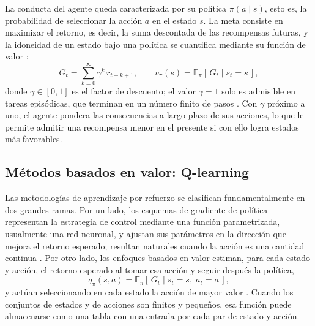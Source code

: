 La conducta del agente queda caracterizada por su política $\pi(a \mid s)$, esto es, la probabilidad de seleccionar la acción $a$ en el estado $s$.
La meta consiste en maximizar el retorno, es decir, la suma descontada de las recompensas futuras, y la idoneidad de un estado bajo una política se cuantifica mediante su función de valor \cite{sutton2018rl}:
\begin{equation}
G_t = \sum_{k=0}^{\infty} \gamma^{k}\, r_{t+k+1},
\qquad
v_{\pi}(s) = \mathbb{E}_{\pi}\!\left[\, G_t \mid s_t = s \,\right],
\label{eq:retorno}
\end{equation}
donde $\gamma \in [0,1]$ es el factor de descuento; el valor $\gamma = 1$ solo es admisible en tareas episódicas, que terminan en un número finito de pasos \cite{sutton2018rl}.
Con $\gamma$ próximo a uno, el agente pondera las consecuencias a largo plazo de sus acciones, lo que le permite admitir una recompensa menor en el presente si con ello logra estados más favorables.

\subsection{Métodos basados en valor: Q-learning}

Las metodologías de aprendizaje por refuerzo se clasifican fundamentalmente en dos grandes ramas.
Por un lado, los esquemas de gradiente de política representan la estrategia de control mediante una función parametrizada, usualmente una red neuronal, y ajustan sus parámetros en la dirección que mejora el retorno esperado; resultan naturales cuando la acción es una cantidad continua \cite{sutton1999policygradient}.
Por otro lado, los enfoques basados en valor estiman, para cada estado y acción, el retorno esperado al tomar esa acción y seguir después la política,
\begin{equation}
q_{\pi}(s,a) = \mathbb{E}_{\pi}\!\left[\, G_t \mid s_t = s,\; a_t = a \,\right],
\label{eq:valor-accion}
\end{equation}
y actúan seleccionando en cada estado la acción de mayor valor \cite{sutton2018rl}.
Cuando los conjuntos de estados y de acciones son finitos y pequeños, esa función puede almacenarse como una tabla con una entrada por cada par de estado y acción.

